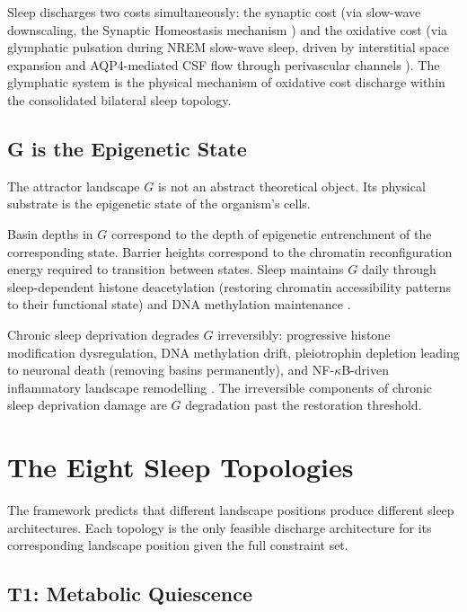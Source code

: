 \documentclass[10pt, a4paper]{article}
\begin{document}
Sleep discharges two costs simultaneously:
the synaptic cost (via slow-wave
downscaling, the Synaptic Homeostasis
mechanism \cite{tononi2006sleep}) and
the oxidative cost (via glymphatic
pulsation during NREM slow-wave sleep,
driven by interstitial space expansion
and AQP4-mediated CSF flow through
perivascular channels \cite{xie2013sleep}).
The glymphatic system is the physical
mechanism of oxidative cost discharge
within the consolidated bilateral sleep
topology.

\subsection{G is the Epigenetic State}

The attractor landscape $G$ is not
an abstract theoretical object. Its
physical substrate is the epigenetic
state of the organism's cells.

Basin depths in $G$ correspond to the
depth of epigenetic entrenchment of
the corresponding state. Barrier heights
correspond to the chromatin
reconfiguration energy required to
transition between states. Sleep
maintains $G$ daily through
sleep-dependent histone deacetylation
(restoring chromatin accessibility
patterns to their functional state)
and DNA methylation maintenance
\cite{lappalainen2023sleep}.

Chronic sleep deprivation degrades $G$
irreversibly: progressive histone
modification dysregulation, DNA
methylation drift, pleiotrophin depletion
leading to neuronal death (removing
basins permanently), and
NF-$\kappa$B-driven inflammatory
landscape remodelling \cite{acs2023sleep}.
The irreversible components of chronic
sleep deprivation damage are $G$
degradation past the restoration
threshold.

\section{The Eight Sleep Topologies}
\label{sec:topologies}

The framework predicts that different
landscape positions produce different
sleep architectures. Each topology is
the only feasible discharge architecture
for its corresponding landscape position
given the full constraint set.

\subsection{T1: Metabolic Quiescence}
\end{document}

